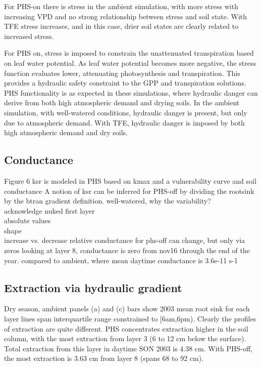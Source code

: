 \documentclass[draft,linenumbers]{agujournal}
\begin{document}
For PHS-on there is stress in the ambient simulation, with more stress with increasing VPD
and no strong relationship between stress and soil state.
With TFE stress increases, and in this case, drier soil states are clearly related to increased stress.

For PHS on, stress is imposed to constrain the unattenuated transpiration based on leaf water potential. 
As leaf water potential becomes more negative, the stress function evaluates lower, attenuating photosynthesis and transpiration.
This provides a hydraulic safety constraint to the GPP and transpiration solutions.
PHS functionality is as expected in these simulations, where hydraulic danger can derive from both high atmospheric demand and drying soils.
In the ambient simulation, with well-watered conditions, hydraulic danger is present, but only due to atmospheric demand. 
With TFE, hydraulic danger is imposed by both high atmospheric demand and dry soils.

\subsection{Conductance}
Figure 6
ksr is modeled in PHS based on kmax and a vulnerability curve and soil conductance
A notion of ksr can be inferred for PHS-off by dividing the rootsink by the btran gradient definition.
well-watered, why the variability?\\
acknowledge nuked first layer \\
absolute values \\
shape \\
increase vs. decrease
relative conductance for phs-off can change, but only via zeros
looking at layer 8, conductance is zero from nov16 through the end of the year.
compared to ambient, where mean daytime conductance is 3.6e-11 s-1

\subsection{Extraction via hydraulic gradient}

Dry season, ambient panels (a) and (c)
bars show 2003 mean root sink for each layer
lines span interquartile range
constrained to [6am,6pm).
Clearly the profiles of extraction are quite different.
PHS concentrates extraction higher in the soil column, with the most extraction from layer 3 (6 to 12 cm below the surface).
Total extraction from this layer in daytime SON 2003 is 4.38 cm.
With PHS-off, the most extraction is 3.63 cm from layer 8 (spans 68 to 92 cm).
\end{document}
